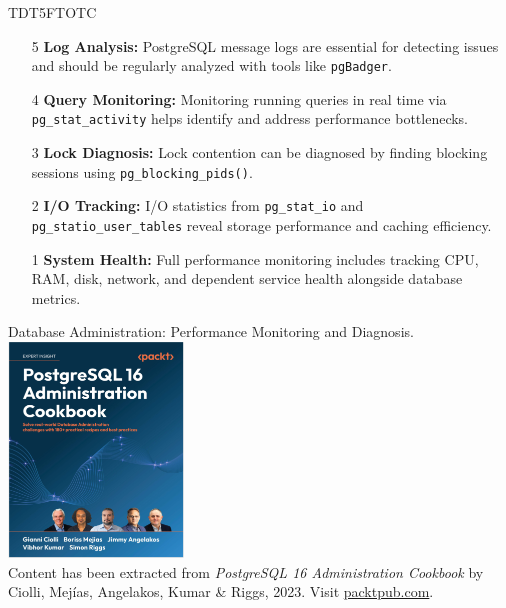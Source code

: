 \documentclass[aspectratio=169]{beamer}
\begin{document}
\begin{frame}{TDT5FTOTC}
    \begin{enumerate}
        \item[5] \textbf{Log Analysis:} PostgreSQL message logs are essential for detecting issues and should be regularly analyzed with tools like \texttt{pgBadger}.\pause

        \item[4] \textbf{Query Monitoring:} Monitoring running queries in real time via \texttt{pg\_stat\_activity} helps identify and address performance bottlenecks. \pause

        \item[3] \textbf{Lock Diagnosis:} Lock contention can be diagnosed by finding blocking sessions using \texttt{pg\_blocking\_pids()}. \pause

        \item[2] \textbf{I/O Tracking:} I/O statistics from \texttt{pg\_stat\_io} and \texttt{pg\_statio\_user\_tables} reveal storage performance and caching efficiency. \pause

        \item[1] \textbf{System Health:} Full performance monitoring includes tracking CPU, RAM, disk, network, and dependent service health alongside database metrics.
        \end{enumerate}
\end{frame}

\begin{frame}{Database Administration: Performance Monitoring and Diagnosis.}
    \centering
    \includegraphics[width=0.35\textwidth]{figures/book_cover4}\\
    \vspace{2mm}
    {
        \scriptsize
        Content has been extracted from \textit{PostgreSQL 16 Administration Cookbook} by Ciolli, Mejías, Angelakos, Kumar \& Riggs, 2023. Visit \href{https://www.packtpub.com/en-us/product/postgresql-16-administration-cookbook-9781835468449}{packtpub.com}.
    }
\end{frame}
\end{document}
